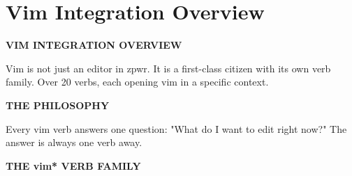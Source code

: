 \documentclass[11pt,a4paper,twoside]{book}
\begin{document}
\section{Vim Integration Overview}


\vspace{10pt}
{\large\bfseries\color{neoncyan} VIM INTEGRATION OVERVIEW}\vspace{6pt}

Vim is not just an editor in zpwr. It is a first-class citizen with its own verb family. Over 20 verbs, each opening vim in a specific context.


\vspace{12pt}
{\bfseries\color{neonyellow} THE PHILOSOPHY}\vspace{4pt}

Every vim verb answers one question: "What do I want to edit right now?" The answer is always one verb away.


\vspace{12pt}
{\bfseries\color{neonyellow} THE vim* VERB FAMILY}\vspace{4pt}
\end{document}
